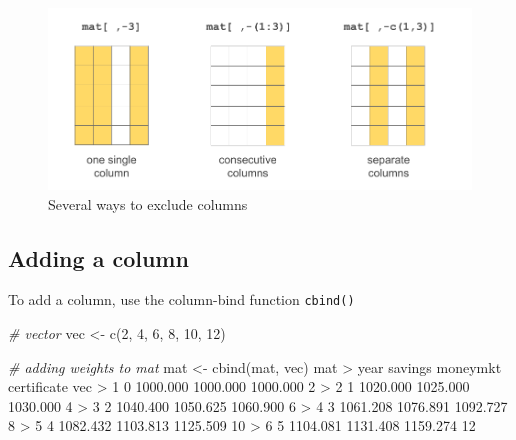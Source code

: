\documentclass[
]{book}
\newenvironment{Shaded}{\begin{snugshade}}{\end{snugshade}}
\newcommand{\CommentTok}[1]{\textcolor[rgb]{0.56,0.35,0.01}{\textit{#1}}}
\newcommand{\DecValTok}[1]{\textcolor[rgb]{0.00,0.00,0.81}{#1}}
\newcommand{\FloatTok}[1]{\textcolor[rgb]{0.00,0.00,0.81}{#1}}
\newcommand{\FunctionTok}[1]{\textcolor[rgb]{0.00,0.00,0.00}{#1}}
\newcommand{\NormalTok}[1]{#1}
\newcommand{\OtherTok}[1]{\textcolor[rgb]{0.56,0.35,0.01}{#1}}
\newcommand{\SpecialCharTok}[1]{\textcolor[rgb]{0.00,0.00,0.00}{#1}}
\begin{document}
\begin{figure}

{\centering \includegraphics[width=0.8\linewidth]{images/objects/obj-matrix-cols2} 

}

\caption{Several ways to exclude columns}\label{fig:unnamed-chunk-134}
\end{figure}

\hypertarget{adding-a-column}{%
\subsection{Adding a column}\label{adding-a-column}}

To add a column, use the column-bind function \texttt{cbind()}

\begin{Shaded}
\begin{Highlighting}[]
\CommentTok{\# vector}
\NormalTok{vec }\OtherTok{\textless{}{-}} \FunctionTok{c}\NormalTok{(}\DecValTok{2}\NormalTok{, }\DecValTok{4}\NormalTok{, }\DecValTok{6}\NormalTok{, }\DecValTok{8}\NormalTok{, }\DecValTok{10}\NormalTok{, }\DecValTok{12}\NormalTok{)}

\CommentTok{\# adding weights to mat}
\NormalTok{mat }\OtherTok{\textless{}{-}} \FunctionTok{cbind}\NormalTok{(mat, vec)}
\NormalTok{mat}
\SpecialCharTok{\textgreater{}}\NormalTok{   year  savings moneymkt certificate vec}
\SpecialCharTok{\textgreater{}} \DecValTok{1}    \DecValTok{0} \FloatTok{1000.000} \FloatTok{1000.000}    \FloatTok{1000.000}   \DecValTok{2}
\SpecialCharTok{\textgreater{}} \DecValTok{2}    \DecValTok{1} \FloatTok{1020.000} \FloatTok{1025.000}    \FloatTok{1030.000}   \DecValTok{4}
\SpecialCharTok{\textgreater{}} \DecValTok{3}    \DecValTok{2} \FloatTok{1040.400} \FloatTok{1050.625}    \FloatTok{1060.900}   \DecValTok{6}
\SpecialCharTok{\textgreater{}} \DecValTok{4}    \DecValTok{3} \FloatTok{1061.208} \FloatTok{1076.891}    \FloatTok{1092.727}   \DecValTok{8}
\SpecialCharTok{\textgreater{}} \DecValTok{5}    \DecValTok{4} \FloatTok{1082.432} \FloatTok{1103.813}    \FloatTok{1125.509}  \DecValTok{10}
\SpecialCharTok{\textgreater{}} \DecValTok{6}    \DecValTok{5} \FloatTok{1104.081} \FloatTok{1131.408}    \FloatTok{1159.274}  \DecValTok{12}
\end{Highlighting}
\end{Shaded}
\end{document}
